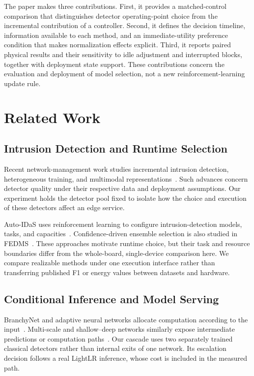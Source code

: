 \documentclass[journal]{IEEEtran}
\begin{document}
The paper makes three contributions. First, it provides a matched-control comparison that distinguishes detector operating-point choice from the incremental contribution of a controller. Second, it defines the decision timeline, information available to each method, and an immediate-utility preference condition that makes normalization effects explicit. Third, it reports paired physical results and their sensitivity to idle adjustment and interrupted blocks, together with deployment state support. These contributions concern the evaluation and deployment of model selection, not a new reinforcement-learning update rule.

\section{Related Work}\label{sec:related}
\subsection{Intrusion Detection and Runtime Selection}
Recent network-management work studies incremental intrusion detection, heterogeneous training, and multimodal representations~\cite{Wang2024BFSNID,StatAvg2025,DMIDS2025}. Such advances concern detector quality under their respective data and deployment assumptions. Our experiment holds the detector pool fixed to isolate how the choice and execution of these detectors affect an edge service.

Auto-IDaS uses reinforcement learning to configure intrusion-detection models, tasks, and capacities~\cite{Lin2024AutoIDaS}. Confidence-driven ensemble selection is also studied in FEDMS~\cite{Hasan2026FEDMS}. These approaches motivate runtime choice, but their task and resource boundaries differ from the whole-board, single-device comparison here. We compare realizable methods under one execution interface rather than transferring published F1 or energy values between datasets and hardware.

\subsection{Conditional Inference and Model Serving}
BranchyNet and adaptive neural networks allocate computation according to the input~\cite{Teerapittayanon2016BranchyNet,Bolukbasi2017Adaptive}. Multi-scale and shallow--deep networks similarly expose intermediate predictions or computation paths~\cite{Huang2018MSDNet,Kaya2019ShallowDeep}. Our cascade uses two separately trained classical detectors rather than internal exits of one network. Its escalation decision follows a real LightLR inference, whose cost is included in the measured path.
\end{document}
